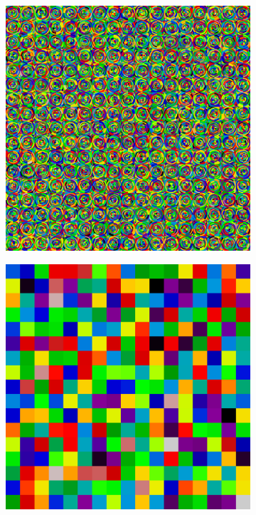 \begin{figure}[hb!]
\centering
\begin{subfigure}{0.45\textwidth}
  \centering
  \includegraphics[width=0.87\linewidth]{figures/quantification/fsrs/fsrs-assm-16}
  \caption{}
  \label{fig:chap8-assm-1.6-fsrs}
\end{subfigure}%
\begin{subfigure}{0.45\textwidth}
  \centering
  \includegraphics[width=0.87\linewidth]{figures/quantification/cmfd/cmfd-cells-assm}

\end{subfigure}
\end{figure}

